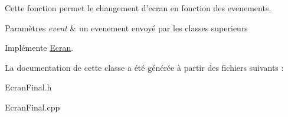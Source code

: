 \-Cette fonction permet le changement d'ecran en fonction des evenements. 


\begin{DoxyParams}{\-Paramètres}
{\em event} & un evenement envoyé par les classes superieurs \\
\hline
\end{DoxyParams}


\-Implémente \hyperlink{classEcran}{\-Ecran}.



\-La documentation de cette classe a été générée à partir des fichiers suivants \-:\begin{DoxyCompactItemize}
\item 
\-Ecran\-Final.\-h\item 
\-Ecran\-Final.\-cpp\end{DoxyCompactItemize}
